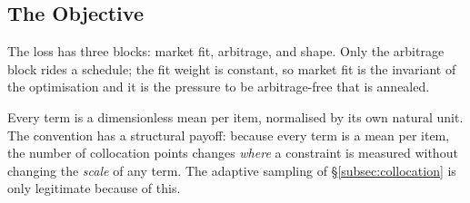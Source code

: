 \subsection{The Objective}
\label{subsec:objective}

The loss has three blocks: market fit, arbitrage, and shape. Only the arbitrage block rides a
schedule; the fit weight is constant, so market fit is the invariant of the optimisation and it is
the pressure to be arbitrage-free that is annealed.

%

Every term is a dimensionless mean per item, normalised by its own natural unit. The convention has a
structural payoff: because every term is a mean per item, the number of collocation points changes
\emph{where} a constraint is measured without changing the \emph{scale} of any term. The adaptive
sampling of \S\ref{subsec:collocation} is only legitimate because of this.



